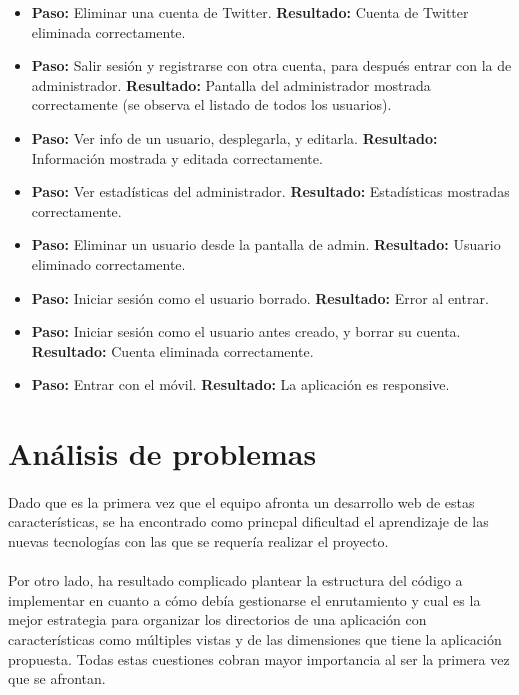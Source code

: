 \documentclass[a4paper]{article}
\begin{document}
\begin{itemize}
    \item \textbf{Paso: }Eliminar una cuenta de Twitter. \textbf{Resultado: }Cuenta de Twitter eliminada correctamente.
    \item \textbf{Paso: }Salir sesión y registrarse con otra cuenta, para después entrar con la de administrador. \textbf{Resultado: }Pantalla del administrador mostrada correctamente (se observa el listado de todos los usuarios).
    \item \textbf{Paso: }Ver info de un usuario, desplegarla, y editarla. \textbf{Resultado: }Información mostrada y editada correctamente.
    \item \textbf{Paso: }Ver estadísticas del administrador. \textbf{Resultado: }Estadísticas mostradas correctamente.
    \item \textbf{Paso: }Eliminar un usuario desde la pantalla de admin. \textbf{Resultado: }Usuario eliminado correctamente.
    \item \textbf{Paso: }Iniciar sesión como el usuario borrado. \textbf{Resultado: }Error al entrar.
    \item \textbf{Paso: }Iniciar sesión como el usuario antes creado, y borrar su cuenta. \textbf{Resultado: }Cuenta eliminada correctamente.
    \item \textbf{Paso: }Entrar con el móvil. \textbf{Resultado: }La aplicación es responsive.
\end{itemize}

\section{Análisis de problemas}

	\paragraph{} Dado que es la primera vez que el equipo afronta un desarrollo web de estas características, se ha encontrado como princpal dificultad el aprendizaje de las nuevas tecnologías con las que se requería realizar el proyecto.
	
	\paragraph{} Por otro lado, ha resultado complicado plantear la estructura del código a implementar en cuanto a cómo debía gestionarse el enrutamiento y cual es la mejor estrategia para organizar los directorios de una aplicación con características como múltiples vistas y de las dimensiones que tiene la aplicación propuesta. Todas estas cuestiones cobran mayor importancia al ser la primera vez que se afrontan.
\end{document}
